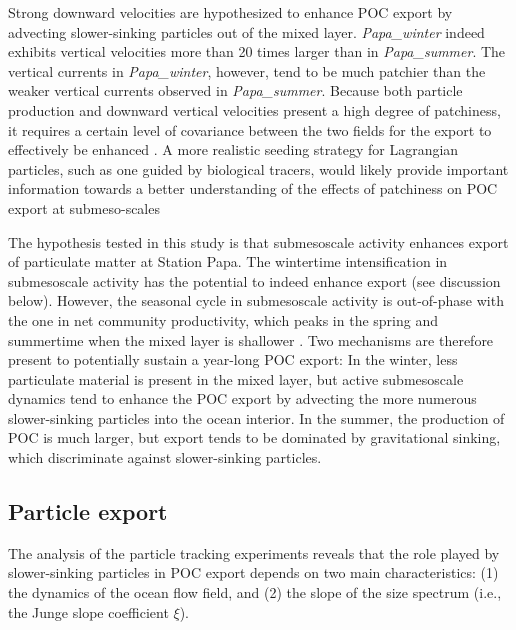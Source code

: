 \documentclass[draft,linenumbers]{agujournal2018}
\begin{document}
Strong downward velocities are hypothesized to enhance POC export by advecting slower-sinking particles out of the mixed layer. \textit{Papa\_winter} indeed exhibits vertical velocities more than 20 times larger than in \textit{Papa\_summer}. The vertical currents in \textit{Papa\_winter}, however, tend to be much patchier than the weaker vertical currents observed in \textit{Papa\_summer}. Because both particle production and downward vertical velocities present a high degree of patchiness, it requires a certain level of covariance between the two fields for the export to effectively be enhanced \citep{Mahadevan_2012}. A more realistic seeding strategy for Lagrangian particles, such as one guided by biological tracers, would likely provide important information towards a better understanding of the effects of patchiness on POC export at submeso-scales

The hypothesis tested in this study is that submesoscale activity enhances export of particulate matter at Station Papa. The wintertime intensification in submesoscale activity has the potential to indeed enhance export (see discussion below). However, the seasonal cycle in submesoscale activity is out-of-phase with the one in net community productivity, which peaks in the spring and summertime when the mixed layer is shallower \citep{Plant_2016}. Two mechanisms are therefore present to potentially sustain a year-long POC export: In the winter, less particulate material is present in the mixed layer, but active submesoscale dynamics tend to enhance the POC export by advecting the more numerous slower-sinking particles into the ocean interior. In the summer, the production of POC is much larger, but export tends to be dominated by gravitational sinking, which discriminate against slower-sinking particles.

\subsection{Particle export}
\label{sec: discussion_particle}

The analysis of the particle tracking experiments reveals that the role played by slower-sinking particles in POC export depends on two main characteristics: (1) the dynamics of the ocean flow field, and (2) the slope of the size spectrum (i.e., the Junge slope coefficient $\xi$).
\end{document}

